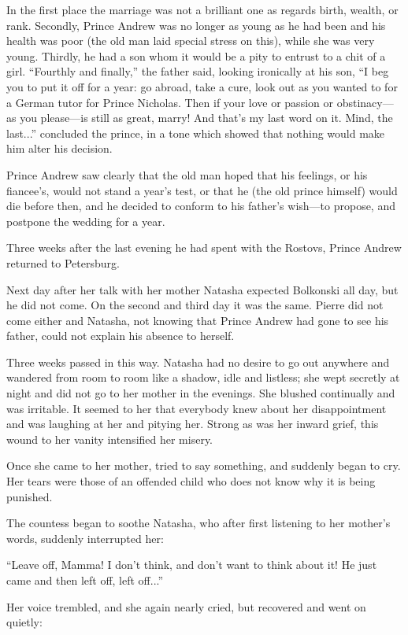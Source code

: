 In the first place the marriage was not a brilliant one as
regards birth, wealth, or rank. Secondly, Prince Andrew was no
longer as young as he had been and his health was poor (the old
man laid special stress on this), while she was very
young. Thirdly, he had a son whom it would be a pity to entrust
to a chit of a girl. ``Fourthly and finally,'' the father said,
looking ironically at his son, ``I beg you to put it off for a
year: go abroad, take a cure, look out as you wanted to for a
German tutor for Prince Nicholas. Then if your love or passion or
obstinacy---as you please---is still as great, marry! And that's
my last word on it.  Mind, the last...'' concluded the prince, in
a tone which showed that nothing would make him alter his
decision.

Prince Andrew saw clearly that the old man hoped that his
feelings, or his fiancee's, would not stand a year's test, or
that he (the old prince himself) would die before then, and he
decided to conform to his father's wish---to propose, and
postpone the wedding for a year.

Three weeks after the last evening he had spent with the Rostovs,
Prince Andrew returned to Petersburg.

Next day after her talk with her mother Natasha expected
Bolkonski all day, but he did not come. On the second and third
day it was the same.  Pierre did not come either and Natasha, not
knowing that Prince Andrew had gone to see his father, could not
explain his absence to herself.

Three weeks passed in this way. Natasha had no desire to go out
anywhere and wandered from room to room like a shadow, idle and
listless; she wept secretly at night and did not go to her mother
in the evenings. She blushed continually and was irritable. It
seemed to her that everybody knew about her disappointment and
was laughing at her and pitying her.  Strong as was her inward
grief, this wound to her vanity intensified her misery.

Once she came to her mother, tried to say something, and suddenly
began to cry. Her tears were those of an offended child who does
not know why it is being punished.

The countess began to soothe Natasha, who after first listening
to her mother's words, suddenly interrupted her:

``Leave off, Mamma! I don't think, and don't want to think about
it! He just came and then left off, left off...''

Her voice trembled, and she again nearly cried, but recovered and
went on quietly:

